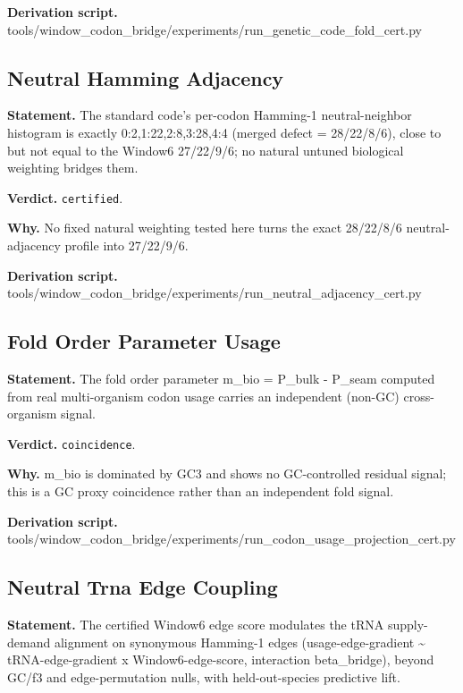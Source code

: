 \textbf{Derivation script.} tools/window\_codon\_bridge/experiments/run\_genetic\_code\_fold\_cert.py

\subsection{Neutral Hamming Adjacency}\label{sec:bridge-neutral-hamming-adjacency}
\textbf{Statement.} The standard code's per-codon Hamming-1 neutral-neighbor histogram is exactly 0:2,1:22,2:8,3:28,4:4
(merged defect = 28/22/8/6), close to but not equal to the Window6 27/22/9/6; no natural untuned
biological weighting bridges them.

\textbf{Verdict.} \texttt{certified}.

\textbf{Why.} No fixed natural weighting tested here turns the exact 28/22/8/6 neutral-adjacency profile into
27/22/9/6.

\textbf{Derivation script.} tools/window\_codon\_bridge/experiments/run\_neutral\_adjacency\_cert.py

\subsection{Fold Order Parameter Usage}\label{sec:bridge-fold-order-parameter-usage}
\textbf{Statement.} The fold order parameter m\_bio = P\_bulk - P\_seam computed from real multi-organism codon usage
carries an independent (non-GC) cross-organism signal.

\textbf{Verdict.} \texttt{coincidence}.

\textbf{Why.} m\_bio is dominated by GC3 and shows no GC-controlled residual signal; this is a GC proxy
coincidence rather than an independent fold signal.

\textbf{Derivation script.} tools/window\_codon\_bridge/experiments/run\_codon\_usage\_projection\_cert.py

\subsection{Neutral Trna Edge Coupling}\label{sec:bridge-neutral-trna-edge-coupling}
\textbf{Statement.} The certified Window6 edge score modulates the tRNA supply-demand alignment on synonymous Hamming-1
edges (usage-edge-gradient \textasciitilde{} tRNA-edge-gradient x Window6-edge-score, interaction
beta\_bridge), beyond GC/f3 and edge-permutation nulls, with held-out-species predictive lift.

